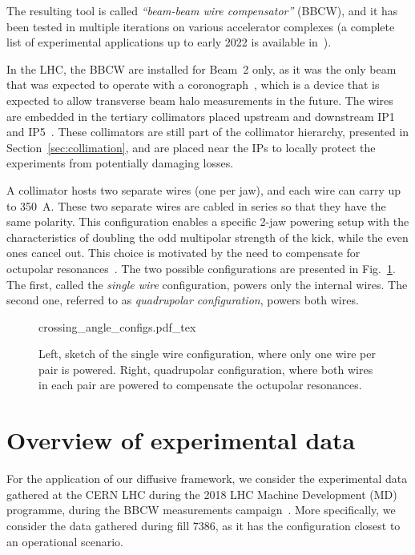 The resulting tool is called \textit{``beam-beam wire compensator''} (BBCW), and it has been tested in multiple iterations on various accelerator complexes (a complete list of experimental applications up to early 2022 is available in~\cite{axel.wires}).

In the LHC, the BBCW are installed for Beam~2 only, as it was the only beam that was expected to operate with a coronograph~\cite{Goldblatt:2313940}, which is a device that is expected to allow transverse beam halo measurements in the future. The wires are embedded in the tertiary collimators placed upstream and downstream IP1 and IP5~\cite{Rossi:2696270}. These collimators are still part of the collimator hierarchy, presented in Section~\ref{sec:collimation}, and are placed near the IPs to locally protect the experiments from potentially damaging losses.

A collimator hosts two separate wires (one per jaw), and each wire can carry up to \SI{350}{\ampere}. These two separate wires are cabled in series so that they have the same polarity. This configuration enables a specific 2-jaw powering setup with the characteristics of doubling the odd multipolar strength of the kick, while the even ones cancel out. This choice is motivated by the need to compensate for octupolar resonances~\cite{Poyet:2703503}. The two possible configurations are presented in Fig.~\ref{fig:wire-configs}. The first, called the \textit{single wire} configuration, powers only the internal wires. The second one, referred to as \textit{quadrupolar configuration}, powers both wires.

\begin{figure}[hpt]
    \centering
    \def\svgwidth{1.0\textwidth}
    {crossing_angle_configs.pdf_tex}
    \caption{Left, sketch of the single wire configuration, where only one wire per pair is powered. Right, quadrupolar configuration, where both wires in each pair are powered to compensate the octupolar resonances.}
    \label{fig:wire-configs}
\end{figure}

\section{Overview of experimental data}\label{sec:5:wire-data}

For the application of our diffusive framework, we consider the experimental data gathered at the CERN LHC during the 2018 LHC Machine Development (MD) programme, during the BBCW measurements campaign~\cite{Poyet:2703503}. More specifically, we consider the data gathered during fill 7386, as it has the configuration closest to an operational scenario.

